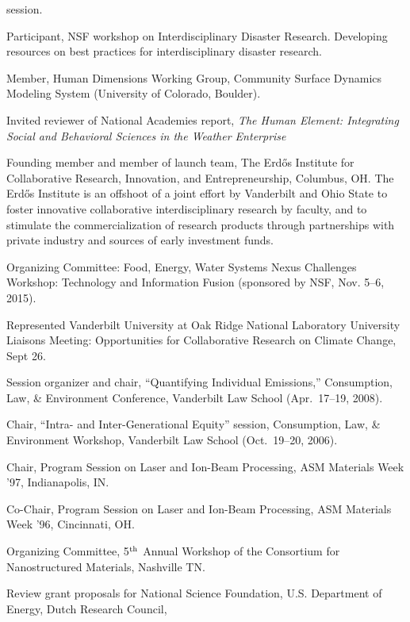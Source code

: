    session.
\item[2017--2018] Participant, NSF workshop on
  Interdisciplinary Disaster Research.
  Developing resources on best practices for interdisciplinary disaster
  research.
\item[2017--2018] Member, Human Dimensions Working Group,
  Community Surface Dynamics Modeling System (University of Colorado, Boulder).
\item[2017] Invited reviewer of National Academies report,
  \emph{The Human Element: Integrating Social and Behavioral Sciences in the
    Weather Enterprise}
\item[2017] Founding member and member of launch team,
  The Erd\H{o}s Institute for Collaborative Research, Innovation, and
  Entrepreneurship, Columbus, OH.
  The Erd\H{o}s Institute is an offshoot of a joint effort by Vanderbilt and
  Ohio State to foster innovative collaborative interdisciplinary research by
  faculty, and to stimulate the commercialization of research products through
  partnerships with private industry and sources of early investment funds.
\item[2015] Organizing Committee:
  Food, Energy, Water Systems Nexus Challenges Workshop: Technology and
  Information Fusion (sponsored by NSF, Nov. 5--6, 2015).
\item[2007] Represented Vanderbilt University at Oak Ridge National Laboratory
  University Liaisons Meeting: Opportunities for Collaborative Research on
  Climate Change, Sept 26.
\item[2008] Session organizer and chair, ``Quantifying Individual Emissions,''
  Consumption, Law, \& Environment Conference, Vanderbilt Law School
  (Apr.\ 17--19, 2008).
\item[2006] Chair, ``Intra- and Inter-Generational Equity'' session,
  Consumption, Law, \& Environment Workshop, Vanderbilt Law School
  (Oct.~19--20, 2006).
\item[1997] Chair, Program Session on Laser and Ion-Beam Processing,
  ASM Materials Week '97, In\-di\-an\-a\-po\-lis, IN.
\item[1996] Co-Chair, Program Session on Laser and Ion-Beam Processing,
  ASM Materials Week '96, Cincinnati, OH.
\item[1996] Organizing Committee,
   5$^{\mbox{\scriptsize th}}$ Annual Workshop of the Consortium for
   Nanostructured Materials, Nashville TN.
\item[Ongoing] Review grant proposals for National Science Foundation,
  U.S. Department of Energy,
  Dutch Research Council,
